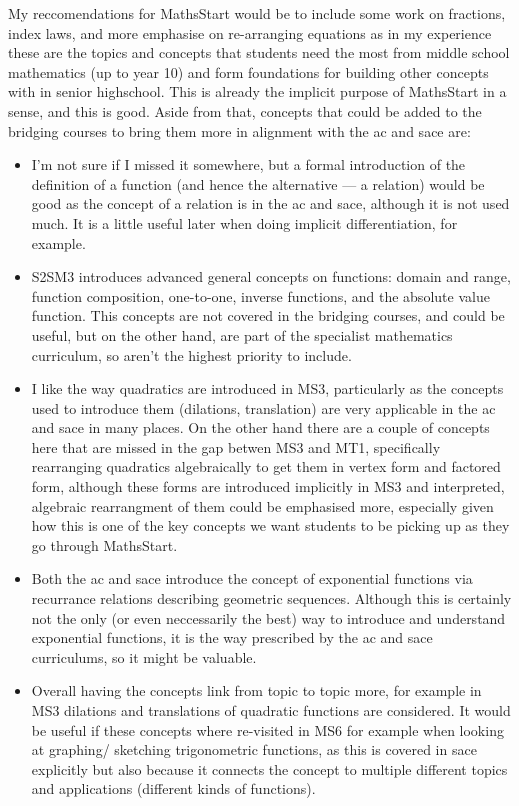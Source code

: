 \documentclass[twoside,12pt,a4paper]{report}
\begin{document}
My reccomendations for MathsStart would be to include some work on fractions, index laws, and more emphasise on re-arranging equations  as in my experience these are the topics and concepts that students need the most from middle school mathematics (up to year 10) and form foundations for building other concepts with in senior highschool. This is already the implicit purpose of MathsStart in a sense, and this is good. Aside from that, concepts that could be added to the bridging courses to bring them more in alignment with the \gls{ac} and \gls{sace} are:
\begin{itemize}
	\item I'm not sure if I missed it somewhere, but a formal introduction of the definition of a function (and hence the alternative --- a relation) would be good as the concept of a relation is in the \gls{ac} and \gls{sace}, although it is not used much. It is a little useful later when doing implicit differentiation, for example.
	\item S2SM3 introduces advanced general concepts on functions: domain and range, function composition, one-to-one, inverse functions, and the absolute value function. This concepts are not covered in the bridging courses, and could be useful, but on the other hand, are part of the specialist mathematics curriculum, so aren't the highest priority to include.
	\item I like the way quadratics are introduced in MS3, particularly as the concepts used to introduce them (dilations, translation) are very applicable in the \gls{ac} and \gls{sace} in many places. On the other hand there are a couple of concepts here that are missed in the gap betwen MS3 and MT1, specifically rearranging quadratics algebraically to get them in vertex form and factored form, although these forms are introduced implicitly in MS3 and interpreted, algebraic rearrangment of them could be emphasised more, especially given how this is one of the key concepts we want students to be picking up as they go through MathsStart. 
	\item Both the \gls{ac} and \gls{sace} introduce the concept of exponential functions via recurrance relations describing geometric sequences. Although this is certainly not the only (or even neccessarily the best) way to introduce and understand exponential functions, it is the way prescribed by the \gls{ac} and \gls{sace} curriculums, so it might be valuable. 
	\item Overall having the concepts link from topic to topic more, for example in MS3 dilations and translations of quadratic functions are considered. It would be useful if these concepts where re-visited in MS6 for example when looking at graphing/ sketching trigonometric functions, as this is covered in \gls{sace} explicitly but also because it connects the concept to multiple different topics and applications (different kinds of functions).

\end{itemize}
\end{document}
